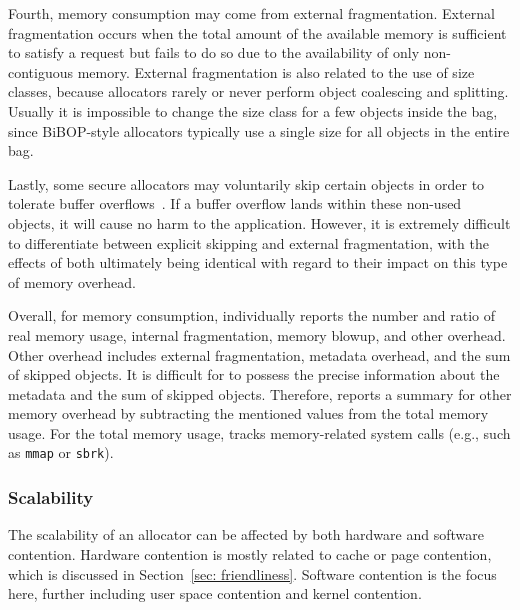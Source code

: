 Fourth, memory consumption may come from external fragmentation. External fragmentation occurs when the total amount of the available memory is sufficient to satisfy a request but fails to do so due to the availability of only non-contiguous memory. External fragmentation is also related to the use of size classes, because allocators rarely or never perform object coalescing and splitting.
Usually it is impossible to change the size class for a few objects inside the bag, since BiBOP-style allocators typically use a single size for all objects in the entire bag. 

 Lastly, some secure allocators may voluntarily skip certain objects in order to tolerate buffer overflows~\citep{DieHard, DieHarder, Guarder}. If a buffer overflow lands within these non-used objects, it will cause no harm to the application. However, it is extremely difficult to differentiate between explicit skipping and external fragmentation, with the effects of both ultimately being identical with regard to their impact on this type of memory overhead. 

Overall, for memory consumption, \MP{} individually reports the number and ratio of real memory usage, internal fragmentation, memory blowup, and other overhead. Other overhead includes external fragmentation, metadata overhead, and the sum of skipped objects. It is difficult for \MP{} to possess the precise information about the metadata and the sum of skipped objects. Therefore, \MP{} reports a summary for other memory overhead by subtracting the mentioned values from the total memory usage. For the total memory usage, \MP{} tracks memory-related system calls (e.g., such as \texttt{mmap} or \texttt{sbrk}). 


\subsubsection{Scalability} 
\label{sec:scalability}

The scalability of an allocator can be affected by both hardware and software contention. Hardware contention is mostly related to cache or page contention, which is discussed in Section~\ref{sec: friendliness}. Software contention is the focus here, further including user space contention and kernel contention. 

